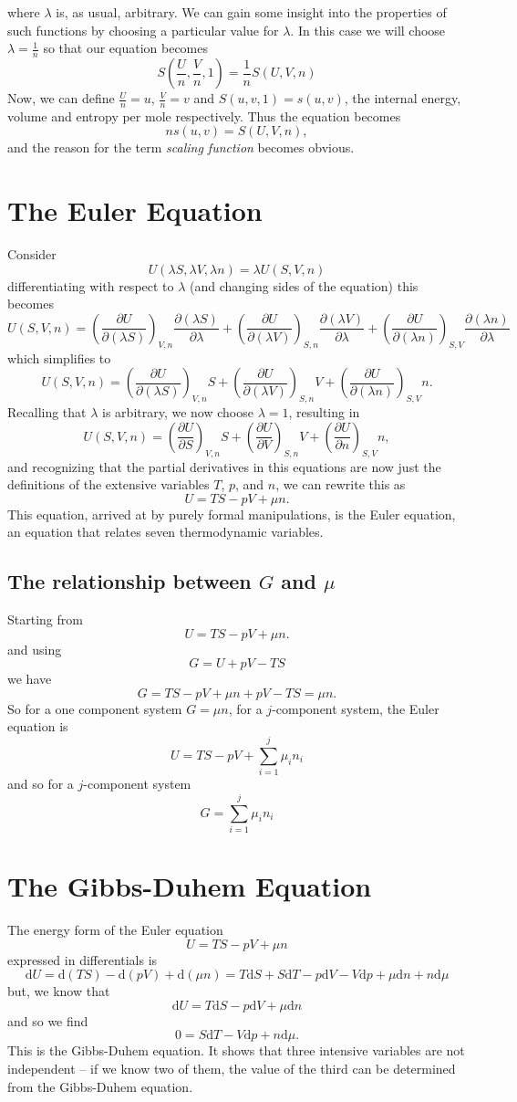 \documentclass[12pt]{article}
\newcommand{\de}{\mathrm{d}}
\begin{document}
 where $\lambda$ is, as usual, arbitrary.  We can gain some insight into the properties of such functions by choosing a particular value for $\lambda$.  In this case we will choose $\lambda=\frac{1}{n}$ so that our equation becomes
 \[
 S\left(\frac{U}{n},\frac{V}{n},1\right)=\frac{1}{n}S(U,V,n)
 \]
 Now, we can define $\frac{U}{n}=u$, $\frac{V}{n}=v$ and $S(u,v,1)=s(u,v)$, the internal energy, volume and entropy per mole respectively.  Thus the equation becomes
 \[
 ns(u,v)=S(U,V,n),
 \]
 and the reason for the term \emph{scaling function} becomes obvious.
 \section{The Euler Equation}
 Consider
 \[
 U(\lambda S,\lambda V, \lambda n)=\lambda U(S,V,n)
 \]
differentiating with respect to $\lambda$ (and changing sides of the equation) this becomes
 \[
 U(S,V,n)=\left(\frac{\partial U}{\partial(\lambda S)}\right)_{V,n}\frac{\partial(\lambda S)}{\partial\lambda} +\left(\frac{\partial U}{\partial(\lambda V)}\right)_{S,n}\frac{\partial(\lambda V)}{\partial\lambda} +\left(\frac{\partial U}{\partial(\lambda n)}\right)_{S,V}\frac{\partial(\lambda n)}{\partial\lambda}    
 \] 
which simplifies to
\[
 U(S,V,n)=\left(\frac{\partial U}{\partial(\lambda S)}\right)_{V,n} S +\left(\frac{\partial U}{\partial(\lambda V)}\right)_{S,n}V +\left(\frac{\partial U}{\partial(\lambda n)}\right)_{S,V}n.
\] 
Recalling that $\lambda$ is arbitrary, we now choose $\lambda=1$, resulting in
\[
 U(S,V,n)=\left(\frac{\partial U}{\partial S}\right)_{V,n} S +\left(\frac{\partial U}{\partial V}\right)_{S,n}V +\left(\frac{\partial U}{\partial n}\right)_{S,V}n,
 \]
 and recognizing that the partial derivatives in this equations are now just the definitions of the extensive variables $T$, $p$, and $n$, we can rewrite this as
 \[
 U=TS-pV+\mu n.
 \]
 This equation, arrived at by purely formal manipulations, is the Euler equation, an equation that relates seven thermodynamic variables.
 \subsection{The relationship between $G$ and $\mu$}
 Starting from
 \[
 U=TS-pV+\mu n.
 \]
 and using
 \[
 G=U+pV-TS
 \]
 we have
 \[
 G=TS-pV+\mu n+pV-TS=\mu n.
 \]
 So for a one component system $G=\mu n$, for a $j$-component system, the Euler equation is
 \[
 U=TS-pV+\sum_{i=1}^{j}\mu_in_i
 \]
 and so for a $j$-component system
 \[
 G= \sum_{i=1}^{j}\mu_in_i
 \]
 
 \section{The Gibbs-Duhem Equation}
The energy form of the Euler equation
 \[
 U=TS-pV+\mu n
 \]
 expressed in differentials is
\[
\de U=\de(TS)-\de(pV)+\de(\mu n)=T\de S+S\de T-p\de V-V\de p+\mu\de n+n\de\mu
\]
but, we know that
\[
\de U=T\de S-p\de V+\mu\de n
\]
and so we find
\[
0=S\de T-V\de p+n\de\mu.
\]
This is the Gibbs-Duhem equation.  It shows that three intensive variables are not independent -- if we know two of them, the value of the third can be determined from the Gibbs-Duhem equation.
\end{document}
